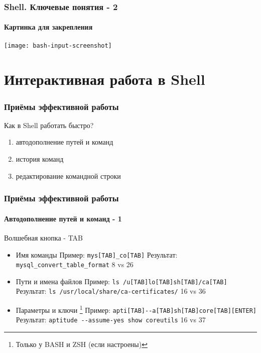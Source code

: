 \begin{frame}
  \frametitle{Shell. Ключевые понятия - 2}
  \framesubtitle{Картинка для закрепления}
    \hbox{\texttt{[image: bash-input-screenshot]}}
\end{frame}

\section{Интерактивная работа в Shell}

\begin{frame}
  \frametitle{Приёмы эффективной работы}

  \alert{\Large{Как в Shell работать быстро?}} 
  \pause

  \begin{enumerate}
    \item \Large{автодополнение путей и команд}
    \item \Large{история команд}
    \item \Large{редактирование командной строки}
  \end{enumerate}

\end{frame}

\begin{frame}[fragile]
  \frametitle{Приёмы эффективной работы}
  \framesubtitle{Автодополнение путей и команд - 1}

  \alert{\Large{Волшебная кнопка - TAB}} \newline
  \pause
  \begin{itemize}
    \item \Large{Имя команды} \pause \newline
      \small{Пример: \verb+mys[TAB]_co[TAB]+} \pause \newline
      \small{Результат: \verb+mysql_convert_table_format+} \newline
      \alert{8 vs 26} \pause
    \item \Large{Пути и имена файлов} \pause \newline
      \small{Пример: \verb+ls /u[TAB]lo[TAB]sh[TAB]/ca[TAB]+} \pause \newline
      \small{Результат: \verb+ls /usr/local/share/ca-certificates/+} \newline
      \alert{16 vs 36} \pause
    \item \Large{Параметры и ключи} \footnote{Только у BASH и ZSH (если настроены)} \pause \newline
      \small{Пример: \verb+apti[TAB]--a[TAB]sh[TAB]core[TAB][ENTER]+} \pause \newline
      \small{Результат: \verb+aptitude --assume-yes show coreutils+} \newline
      \alert{16 vs 37} \pause
  \end{itemize}
\end{frame}

